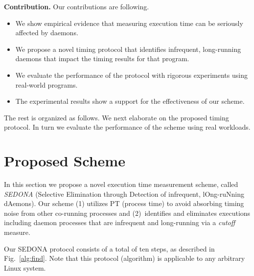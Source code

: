 \documentclass[letter]{ieice}
\begin{document}
\vspace{0.05in}
{\bf Contribution.} 
Our contributions are following.
\vspace{-0.05in}
\begin{itemize}

\item We show empirical evidence that 
measuring execution time 
can be seriously affected by daemons.

\item We propose a novel timing protocol that
identifies infrequent, long-running daemons that impact the timing results for that program. 

\item {\color{blue}We evaluate the performance of the protocol with rigorous experiments 
using real-world programs.}

\item The experimental results show a support for the effectiveness of our scheme. 

\end{itemize}
\vspace{-0.05in}

\noindent
{\color{blue}The rest is organized as follows. 
We next elaborate on the proposed timing protocol. In turn we evaluate the performance of the scheme using real workloads. 
}


\section{Proposed Scheme}
\label{sec:prop_appach}

In this section we propose a novel execution time measurement scheme, 
called {\em SEDONA} (Selective Elimination through Detection of infrequent, lOng-ruNning dAemons). 
{\color{blue} Our scheme (1) utilizes PT (process time) to avoid absorbing timing noise from other co-running processes and (2)~identifies and eliminates executions including daemon processes that are infrequent and \hbox{long-running} via a {\em cutoff} measure. 
}

Our SEDONA protocol consists of a total of ten steps, as described in Fig.~\ref{alg:find}. 
{\color{blue}Note that this protocol (algorithm) is applicable to any arbitrary Linux system.}
\end{document}
